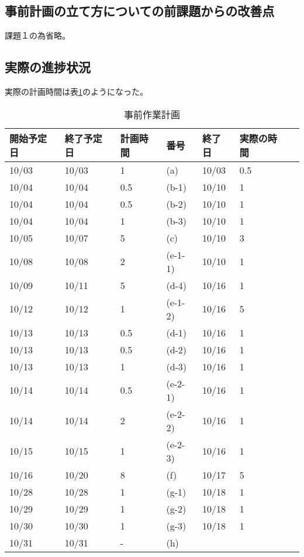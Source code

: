 \documentclass[a4j]{jsarticle}
\begin{document}
  \subsection{事前計画の立て方についての前課題からの改善点}
  課題１の為省略。

  \subsection{実際の進捗状況}
  実際の計画時間は表\ref{tab:schedule2}のようになった。
  \begin{table}[H]
    \centering
    \caption{事前作業計画}
    \label{tab:schedule2}
    \begin{tabular}{|l|l|l|l|l|l|l|}
      \hline
      開始予定日&終了予定日&計画時間&番号&終了日&実際の時間\\ \hline
      10/03 & 10/03 & 1 & (a) & 10/03 & 0.5 \\ \hline
      10/04 & 10/04 & 0.5 & (b-1) & 10/10 & 1 \\ \hline
      10/04 & 10/04 & 0.5 & (b-2) & 10/10 & 1  \\ \hline
      10/04 & 10/04 & 1 & (b-3) & 10/10 & 1  \\ \hline
      10/05 & 10/07 & 5 & (c) & 10/10 & 3  \\ \hline
      10/08 & 10/08 & 2 & (e-1-1) & 10/10 & 1  \\ \hline
      10/09 & 10/11 & 5 & (d-4) & 10/16 & 1  \\ \hline
      10/12 & 10/12 & 1 & (e-1-2) & 10/16 & 5  \\ \hline
      10/13 & 10/13 & 0.5 & (d-1) & 10/16 & 1  \\ \hline
      10/13 & 10/13 & 0.5 & (d-2) & 10/16 & 1  \\ \hline
      10/13 & 10/13 & 1 & (d-3) & 10/16 & 1  \\ \hline
      10/14 & 10/14 & 0.5 & (e-2-1) & 10/16 & 1  \\ \hline
      10/14 & 10/14 & 2 & (e-2-2) & 10/16 & 1  \\ \hline
      10/15 & 10/15 & 1 & (e-2-3) & 10/16 & 1  \\ \hline
      10/16 & 10/20 & 8 & (f) & 10/17 & 5  \\ \hline
      10/28 & 10/28 & 1 & (g-1) & 10/18 & 1  \\ \hline
      10/29 & 10/29 & 1 & (g-2) & 10/18 & 1  \\ \hline
      10/30 & 10/30 & 1 & (g-3) & 10/18 & 1  \\ \hline
      10/31 & 10/31 & - & (h) &  &  \\ \hline
    \end{tabular}
  \end{table}
\end{document}
